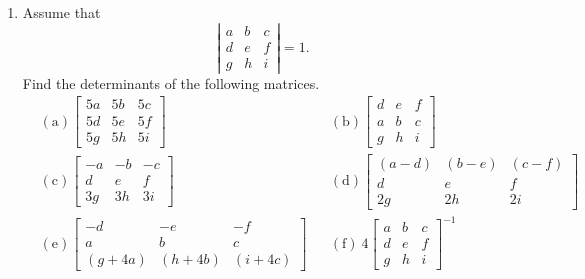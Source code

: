\begin{enumerate}
\item Assume that $$\left | \begin{array}{rrr}
a&b&c\\d&e&f\\g&h&i \end{array} \right |=1.$$ Find the
determinants of the following matrices.
\begin{align*}
&\mathrm{(a)} \left[ \begin{array}{rrr} 5a&5b&5c\\5d&5e&5f\\5g&5h&5i \end{array} \right]&
&\mathrm{(b)} \left[ \begin{array}{rrr} d&e&f\\ a&b&c \\g&h&i \end{array} \right ]\\
&\mathrm{(c)} \left[ \begin{array}{rrr} -a&-b&-c\\ d&e&f\\ 3g&3h&3i\end{array} \right ]&
&\mathrm{(d)} \left[ \begin{array}{ccc} (a-d)&(b-e)&(c-f)\\ d&e&f\\ 2g&2h&2i\end{array}\right]\\
&\mathrm{(e)} \left[ \begin{array}{ccc} -d&-e&-f\\ a&b&c\\ (g+4a)&(h+4b)&(i+4c) \end{array} \right ]&
&\mathrm{(f)} \ 4\left[ \begin{array}{rrr} a&b&c\\d&e&f\\g&h&i \end{array} \right]^{-1}
\end{align*}\\


\end{enumerate}
